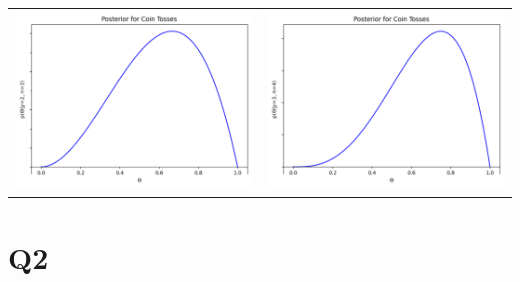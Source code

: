 \documentclass[]{article}
\begin{document}
\begin{center}
\begin{tabular}{cc}
        \includegraphics[scale = 0.25]{1_c_3.png} & \includegraphics[scale = 0.25]{1_c_4.png}
    \end{tabular}
\end{center}
\pagebreak
\section*{Q2}
\end{document}
